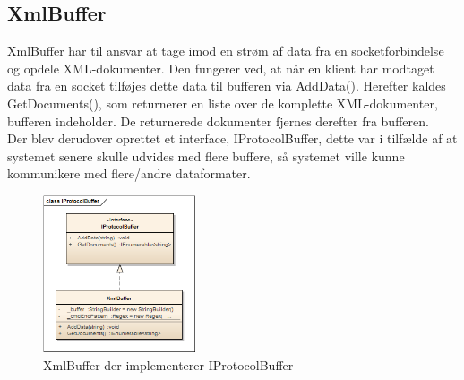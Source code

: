 \subsection{XmlBuffer}
XmlBuffer har til ansvar at tage imod en strøm af data fra en socketforbindelse og opdele XML-dokumenter. Den fungerer ved, at når en klient har modtaget data fra en socket tilføjes dette data til bufferen via AddData(). Herefter kaldes GetDocuments(), som returnerer en liste over de komplette XML-dokumenter, bufferen indeholder. De returnerede dokumenter fjernes derefter fra bufferen.\\

Der blev derudover oprettet et interface, IProtocolBuffer, dette var i tilfælde af at systemet senere skulle udvides med flere buffere, så systemet ville kunne kommunikere med flere/andre dataformater.

\begin{figure}[H]
	\centering
	\includegraphics[width=0.4\textwidth]{Systemdesign/SharedLib/Images/Klasser/IProtocolBuffer.png}
	\caption{XmlBuffer der implementerer IProtocolBuffer}
	\label{fig:klasseXmlBuf}
\end{figure}
